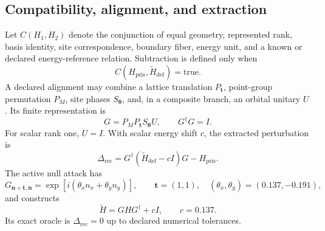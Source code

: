 \documentclass[11pt]{article}
\begin{document}
\subsection{Compatibility, alignment, and extraction}

Let $C(H_1,H_2)$ denote the conjunction of equal geometry, represented rank, basis
identity, site correspondence, boundary fiber, energy unit, and a known or declared
energy-reference relation.  Subtraction is defined only when
\begin{equation}
  C(H_{\mathrm{pris}},\widetilde H_{\mathrm{def}})=\mathrm{true}.
\end{equation}
A declared alignment may combine a lattice translation $P_{\mathbf t}$, point-group
permutation $P_M$, site phases $S_{\boldsymbol\theta}$, and, in a composite branch, an
orbital unitary $U$.  Its finite representation is
\begin{equation}
  G=P_M P_{\mathbf t}S_{\boldsymbol\theta}U,
  \qquad G^{\dagger}G=I.
\end{equation}
For scalar rank one, $U=I$.  With scalar energy shift $c$, the extracted perturbation is
\begin{equation}
  \Delta_{\mathrm{rec}}
  =G^{\dagger}(\widetilde H_{\mathrm{def}}-cI)G-H_{\mathrm{pris}}.
  \label{eq:aligned-extraction}
\end{equation}
The active null attack has
\begin{equation}
  G_{\mathbf n+\mathbf t,\mathbf n}
  =\exp\!\left[i(\theta_x n_x+\theta_y n_y)\right],
  \qquad
  \mathbf t=(1,1),
  \quad
  (\theta_x,\theta_y)=(0.137,-0.191),
\end{equation}
and constructs
\begin{equation}
  \widetilde H=GHG^{\dagger}+cI,
  \qquad c=0.137.
\end{equation}
Its exact oracle is $\Delta_{\mathrm{rec}}=0$ up to declared numerical tolerances.
\end{document}
